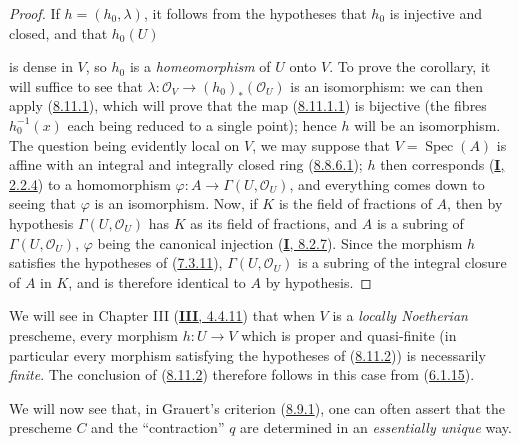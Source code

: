 \begin{proof}
If $h=(h_0,\lambda)$, it follows from the hypotheses that $h_0$ is injective
and closed, and that $h_0(U)$

is dense in $V$, so $h_0$ is a \emph{homeomorphism} of $U$ onto $V$.
To prove the corollary, it will suffice to see that
$\lambda:\mathcal{O}_V\to(h_0)_*(\mathcal{O}_U)$ is an isomorphism: we
can then apply (\hyperref[II.8.11.1]{8.11.1}), which will prove that
the map (\hyperref[II.8.11.1.1]{8.11.1.1}) is bijective (the fibres
$h_0^{-1}(x)$ each being reduced to a single point); hence $h$ will be an
isomorphism. The question being evidently local on $V$, we may suppose
that $V=\operatorname{Spec}(A)$ is affine with an integral and integrally
closed ring (\hyperref[II.8.8.6.1]{8.8.6.1}); $h$ then corresponds
(\hyperref[I.2.2.4]{\textbf{I}, 2.2.4}) to a homomorphism
$\varphi:A\to\Gamma(U,\mathcal{O}_U)$, and everything comes down to seeing
that $\varphi$ is an isomorphism. Now, if $K$ is the field of fractions of
$A$, then by hypothesis $\Gamma(U,\mathcal{O}_U)$ has $K$ as its field of
fractions, and $A$ is a subring of $\Gamma(U,\mathcal{O}_U)$, $\varphi$ being
the canonical injection (\hyperref[I.8.2.7]{\textbf{I}, 8.2.7}). Since the morphism
$h$ satisfies the hypotheses of (\hyperref[II.7.3.11]{7.3.11}),
$\Gamma(U,\mathcal{O}_U)$ is a subring of the integral closure of $A$
in $K$, and is therefore identical to $A$ by hypothesis.
\end{proof}

\begin{remark}[8.11.3]
\label{II.8.11.3}
We will see in Chapter III (\hyperref[III.4.4.11]{\textbf{III}, 4.4.11}) that when
$V$ is a \emph{locally Noetherian} prescheme, every morphism $h:U\to V$
which is proper and quasi-finite (in particular every morphism satisfying the
hypotheses of (\hyperref[II.8.11.2]{8.11.2})) is necessarily
\emph{finite}. The conclusion of (\hyperref[II.8.11.2]{8.11.2}) therefore
follows in this case from (\hyperref[II.6.1.15]{6.1.15}).
\end{remark}

\begin{env}[8.11.4]
\label{II.8.11.4}
We will now see that, in Grauert's criterion
(\hyperref[II.8.9.1]{8.9.1}), one can often assert that the prescheme
$C$ and the ``contraction'' $q$ are determined in an \emph{essentially
unique} way.
\end{env}

